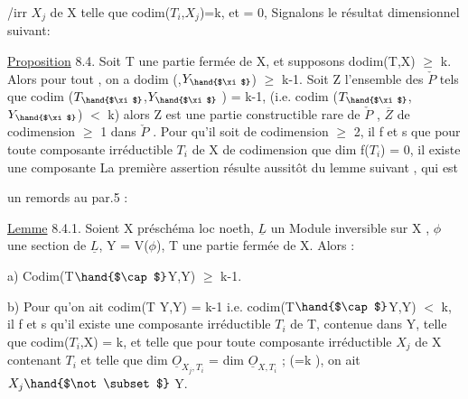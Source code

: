 /irr $X_j$ de X telle que codim($T_i$,$X_j$)=k, et  = 0, 
Signalons le résultat dimensionnel suivant:

\uline{Proposition} 8.4. Soit T une partie fermée de X, et supposons
dodim(T,X) $\geq$ k. Alors pour tout , on a dodim (,$Y_{\hand{$\xi$}}$) $\geq$ k-1. Soit
Z l'ensemble des \hand{$\xi\in$} $\check{P}$ tels que codim ($T_{\hand{$\xi$}}$,$Y_{\hand{$\xi$}}$ ) = k-1, (i.e.
codim ($T_{\hand{$\xi$}}$,$Y_{\hand{$\xi$}}$) $<$ k) alors Z est une partie constructible rare de $\check{P}$ ,
 $\overline{Z}$  de codimension $\geq$ 1 dans $\check{P}$ . Pour qu'il soit de
codimension $\geq$ 2, il f et s que pour toute composante irréductible
$T_i$ de X de codimension  
que dim f($T_i$) = 0, il existe une composante \hand{/}
La première assertion résulte aussitôt du lemme suivant , qui est

un remords au par.5 :

\uline{Lemme} 8.4.1. Soient X préschéma loc noeth, $\underline{L}$ un Module inversible sur
X , $\phi$ une section de $\underline{L}$, Y = V($\phi$), T une partie fermée de X.  Alors :

a) Codim(T$\hand{$\cap$}$Y,Y) $\geq$ k-1.

b) Pour qu'on ait codim(T Y,Y) = k-1 i.e. codim(T$\hand{$\cap$}$Y,Y) $<$ k, il
f et s qu'il existe une composante irréductible $T_i$ de T, contenue dans
Y,  telle que codim($T_i$,X) = k, et telle que pour toute composante
irréductible $X_j$ de X  contenant $T_i$ et telle que dim $\underline{O}_{X_j,T_i}$ =
dim $\underline{O}_{X,T_i}$ ; (=k ), on ait $X_j \hand{$\not\subset$}$ Y.

